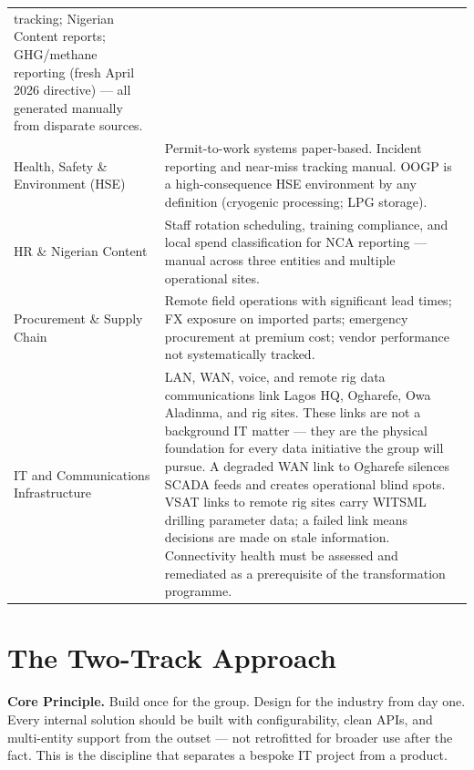 \documentclass[10pt]{article}
\begin{document}
\begin{tabularx}{\columnwidth}{@{}lX@{}}
    tracking; Nigerian Content reports; GHG/methane reporting (fresh April 2026
    directive) --- all generated manually from disparate sources. \\[4pt]
Health, Safety \& Environment (HSE)
  & Permit-to-work systems paper-based. Incident reporting and near-miss
    tracking manual. OOGP is a high-consequence HSE environment by any
    definition (cryogenic processing; LPG storage). \\[4pt]
HR \& Nigerian Content
  & Staff rotation scheduling, training compliance, and local spend
    classification for NCA reporting --- manual across three entities and
    multiple operational sites. \\[4pt]
Procurement \& Supply Chain
  & Remote field operations with significant lead times; FX exposure on
    imported parts; emergency procurement at premium cost; vendor performance
    not systematically tracked. \\[4pt]
IT and Communications Infrastructure
  & LAN, WAN, voice, and remote rig data communications link Lagos HQ,
    Ogharefe, Owa Aladinma, and rig sites. These links are not a background IT
    matter --- they are the physical foundation for every data initiative the
    group will pursue. A degraded WAN link to Ogharefe silences SCADA feeds and
    creates operational blind spots. VSAT links to remote rig sites carry
    WITSML drilling parameter data; a failed link means decisions are made on
    stale information. Connectivity health must be assessed and remediated as a
    prerequisite of the transformation programme. \\
\bottomrule
\end{tabularx}
\normalsize

\vspace{10pt}

\section{The Two-Track Approach}

\noindent\colorbox{primary!8}{%
\begin{minipage}{\dimexpr\textwidth-2\fboxsep}
  \vspace{5pt}
  \textbf{\color{primary}Core Principle.}\quad
  Build once for the group. Design for the industry from day one. Every internal
  solution should be built with configurability, clean APIs, and multi-entity
  support from the outset --- not retrofitted for broader use after the fact.
  This is the discipline that separates a bespoke IT project from a product.
  \vspace{5pt}
\end{minipage}}
\end{document}
